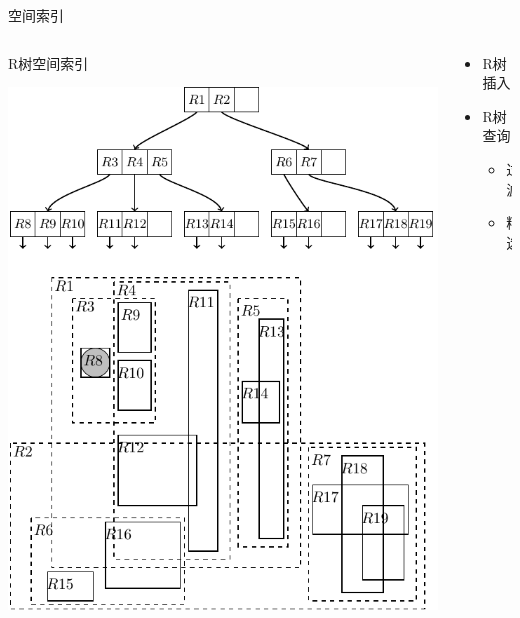 \begin{frame}[c]{空间索引}
    \begin{columns}
        \begin{column}{0.6 \textwidth}
        R树空间索引

        \vspace{1em}
        \includegraphics[scale=0.4]{figures/rtree.pdf}
        \end{column}

        \pause
        \begin{column}{0.4 \textwidth}
            \begin{itemize}
                \item R树插入
                \pause
                \item R树查询
                    \begin{itemize}
                        \pause
                        \item 过滤
                        \pause
                        \item 精选
                    \end{itemize}
            \end{itemize}
        \end{column}
    \end{columns}
\end{frame}


